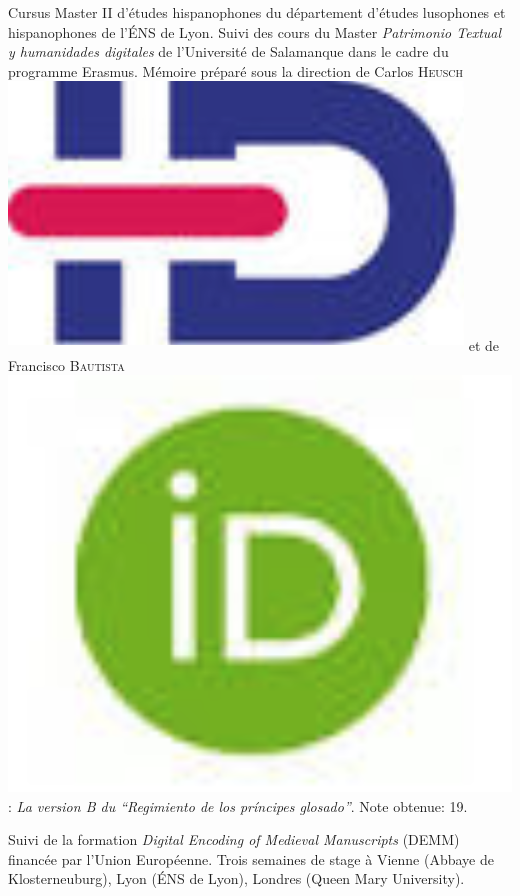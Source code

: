 \begin{rubric}{Cursus}
                                \entry*[2015-2016]
                             Master II d'études hispanophones du département d'études lusophones et
                        hispanophones de l'ÉNS de Lyon. Suivi des cours du Master \textit{Patrimonio
                            Textual y humanidades digitales} de l’Université de Salamanque dans le
                        cadre du programme Erasmus. Mémoire préparé sous la direction de Carlos \textsc{Heusch}\href{https://www.idref.fr/055838413}{\textsuperscript{\includegraphics[scale=0.025]{img/idref.png}}} et de Francisco \textsc{Bautista}\href{https://orcid.org/0000-0002-2676-0388}{\includegraphics[scale=0.025]{img/orcid.png}}: \textit{La
                            version B du ``Regimiento de los príncipes glosado''}. Note
                        obtenue: 19. 
                    
                                \entry*
                            Suivi de la formation \textit{Digital Encoding of Medieval Manuscripts}
                        (DEMM) financée par l’Union Européenne. Trois semaines de stage à Vienne (Abbaye
                        de Klosterneuburg), Lyon (ÉNS de Lyon), Londres (Queen Mary University). 
                    

\end{rubric}
